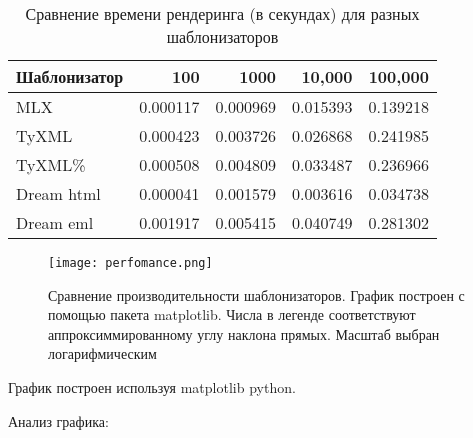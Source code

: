 
\begin{table}[h]
    \centering
    \caption{Сравнение времени рендеринга (в секундах) для разных шаблонизаторов}
    \label{tab:rendering-times}
    \begin{tabular}{lrrrr}
        \toprule
        \textbf{Шаблонизатор} & \textbf{100} & \textbf{1000} & \textbf{10,000} & \textbf{100,000} \\
        \midrule
        MLX                   & 0.000117     & 0.000969      & 0.015393        & 0.139218         \\
        TyXML                 & 0.000423     & 0.003726      & 0.026868        & 0.241985         \\
        TyXML\%               & 0.000508     & 0.004809      & 0.033487        & 0.236966         \\
        Dream html            & 0.000041     & 0.001579      & 0.003616        & 0.034738         \\
        Dream eml             & 0.001917     & 0.005415      & 0.040749        & 0.281302         \\
        \bottomrule
    \end{tabular}
\end{table}


\begin{figure}
    \texttt{[image: perfomance.png]}
    \label{fig:perfomance}
    \caption{Сравнение производительности шаблонизаторов. График построен с помощью пакета matplotlib. Числа в легенде соответствуют аппроксиммированному углу наклона прямых. Масштаб выбран логарифмическим}
\end{figure}

График построен используя matplotlib python.

Анализ графика: